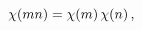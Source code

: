 \[\mathop{\chi\/}\nolimits\!\left(mn\right)=\mathop{\chi\/}\nolimits\!\left(m%
\right)\mathop{\chi\/}\nolimits\!\left(n\right),\]
